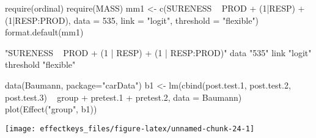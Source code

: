 \documentclass[
]{article}
\begin{document}
\begin{Schunk}
\begin{Sinput}
 require(ordinal)
 require(MASS)
 mm1 <- c(SURENESS ~ PROD + (1|RESP) + (1|RESP:PROD), 
                data = 535, link = "logit", threshold = "flexible")
 format.default(mm1)
\end{Sinput}
\begin{Soutput}
                                                 
"SURENESS ~ PROD + (1 | RESP) + (1 | RESP:PROD)" 
                                            data 
                                           "535" 
                                            link 
                                         "logit" 
                                       threshold 
                                      "flexible" 
\end{Soutput}
\end{Schunk}
\begin{Schunk}
\begin{Sinput}
 data(Baumann, package="carData")
 b1 <- lm(cbind(post.test.1, post.test.2, post.test.3) ~ group + 
               pretest.1 + pretest.2, data = Baumann)
 plot(Effect("group", b1))
\end{Sinput}

\texttt{[image: effectkeys\_files/figure-latex/unnamed-chunk-24-1]} \end{Schunk}
\end{document}
